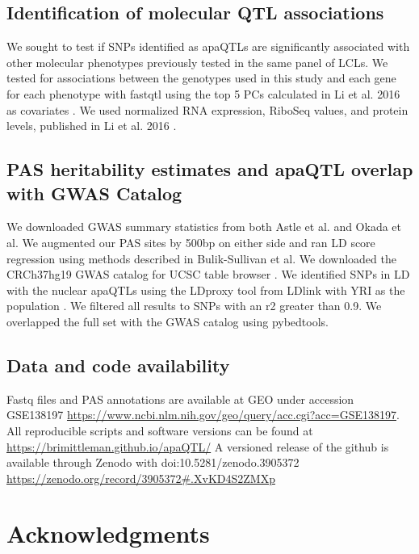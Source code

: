 \subsection{Identification of molecular QTL associations}\label{Identification-molecular-QTL-associations}
We sought to test if SNPs identified as apaQTLs are significantly associated with other molecular phenotypes previously tested in the same panel of LCLs. We tested for associations between the genotypes used in this study and each gene for each phenotype with fastqtl using the top 5 PCs calculated in Li et al. 2016 as covariates \citep{li_rna_2016}. We used normalized RNA expression, RiboSeq values, and protein levels, published in Li et al. 2016 \citep{li_rna_2016}. 


\subsection{PAS heritability estimates and apaQTL overlap with GWAS Catalog}\label{PAS-heritability-estimates-GWAS-Catalog}
We downloaded GWAS summary statistics from both Astle et al. and Okada et al. \citep{astle_allelic_2016, okada_genetics_2014} We augmented our PAS sites by 500bp on either side and ran LD score regression using methods described in Bulik-Sullivan et al. \citep{bulik-sullivan_ld_2015} We downloaded the CRCh37hg19 GWAS catalog for UCSC table browser \citep{kent_human_2002}. We identified SNPs in LD with the nuclear apaQTLs using the LDproxy tool from LDlink with YRI as the population \citep{machiela_ldlink_2015}. We filtered all results to SNPs with an r2 greater than 0.9. We overlapped the full set with the GWAS catalog using pybedtools. 



\subsection{Data and code
availability}\label{ch02-data-and-code-availability}

Fastq files and PAS annotations are available at GEO under accession GSE138197 \url{https://www.ncbi.nlm.nih.gov/geo/query/acc.cgi?acc=GSE138197}. All reproducible scripts and software versions can be found at \url{https://brimittleman.github.io/apaQTL/} A versioned release of the github is available through Zenodo with doi:10.5281/zenodo.3905372 \url{https://zenodo.org/record/3905372#.XvKD4S2ZMXp}

\section{Acknowledgments}\label{ch02-acknowledgments}

